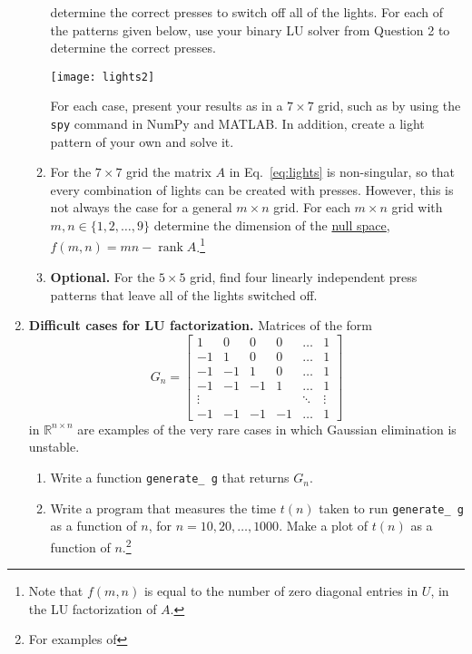 \documentclass[11pt]{article}
\newcommand{\R}{\mathbb{R}}
\DeclareMathOperator{\rank}{rank}
\begin{document}
\begin{enumerate}
\begin{enumerate}
	determine the correct presses to switch off all of the lights. For each
	of the patterns given below, use your binary LU solver from Question 2
	to determine the correct presses.
	\begin{center}
	  \texttt{[image: lights2]}
	\end{center}
	For each case, present your results as in a $7\times 7$ grid, such as
	by using the \texttt{spy} command in NumPy and MATLAB. In addition,
	create a light pattern of your own and solve it.
      \item For the $7\times 7$ grid the matrix $A$ in Eq.~\ref{eq:lights} is
	non-singular, so that every combination of lights can be created with
	presses. However, this is not always the case for a general $m\times n$
	grid. For each $m\times n$ grid with $m,n\in \{1,2,\ldots,9\}$
	determine the dimension of the
	\href{http://en.wikipedia.org/wiki/Kernel_(linear_algebra)}{null
	space}, $f(m,n)=mn-\rank A$.\footnote{Note that $f(m,n)$ is equal to
	the number of zero diagonal entries in $U$, in the LU factorization of $A$.}
      \item {\bf Optional.} For the $5\times 5$ grid, find four linearly
	independent press patterns that leave all of the lights switched off.
    \end{enumerate}
  \item {\bf Difficult cases for LU factorization.} Matrices of the form 
      \begin{equation}
	G_n =
	\left[
	\begin{array}{cccccc}
	 1 &0 &0 &0&\ldots &1\\
	 -1 &1 &0 &0&\ldots &1\\
	 -1 &-1 &1 &0&\ldots &1\\
	 -1 &-1 &-1 &1&\ldots &1\\
	 \vdots & & & & \ddots & \vdots\\
	-1 & -1 & -1 &-1& \ldots & 1
	\end{array}
	\right]
      \end{equation}
    in $\R^{n\times n}$ are examples of the very rare cases in which Gaussian elimination is unstable.
    \begin{enumerate}
      \item Write a function \texttt{generate\_\,g} that returns $G_n$.
      \item Write a program that measures the time $t(n)$ taken to run
	\texttt{generate\_\,g} as a function of $n$, for $n=10,20,\ldots,1000$.
	Make a plot of $t(n)$ as a function of $n$.\footnote{For examples of
}
\end{enumerate}
\end{enumerate}
\end{document}
